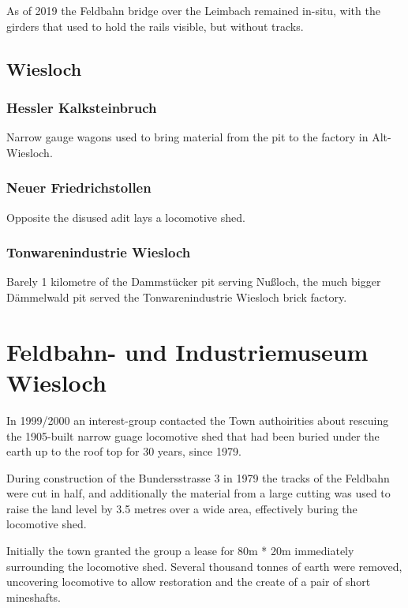 \documentclass[a4paper]{report}
\begin{document}
As of 2019 the Feldbahn bridge over the Leimbach remained in-situ, with the
girders that used to hold the rails visible, but without tracks.

\section{Wiesloch}

\subsection{Hessler Kalksteinbruch}

Narrow gauge wagons used to bring material from the pit to the factory in Alt-Wiesloch.

\subsection{Neuer Friedrichstollen}

Opposite the disused adit lays a locomotive shed.

\subsection{Tonwarenindustrie Wiesloch}

Barely 1 kilometre of the Dammstücker pit serving Nußloch, the much
bigger Dämmelwald pit served the Tonwarenindustrie Wiesloch brick
factory.

\chapter{Feldbahn- und Industriemuseum Wiesloch}

In 1999/2000 an interest-group contacted the Town authoirities about
rescuing the 1905-built narrow guage locomotive shed that had been
buried under the earth up to the roof top for 30 years, since 1979.

During construction of the Bundersstrasse 3 in 1979 the tracks of the Feldbahn were cut in half, and additionally the material from a large cutting was used to raise the land level by 3.5 metres over a wide area, effectively buring the locomotive shed.

Initially the town granted the group a lease for 80m * 20m immediately
surrounding the locomotive shed.  Several thousand tonnes of earth
were removed, uncovering locomotive to allow restoration and the
create of a pair of short mineshafts.
\end{document}
